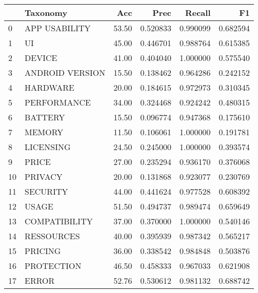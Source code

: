 \begin{tabular}{llrrrr}
\toprule
{} &         Taxonomy &    Acc &      Prec &    Recall &        F1 \\
\midrule
0  &    APP USABILITY &  53.50 &  0.520833 &  0.990099 &  0.682594 \\
1  &               UI &  45.00 &  0.446701 &  0.988764 &  0.615385 \\
2  &           DEVICE &  41.00 &  0.404040 &  1.000000 &  0.575540 \\
3  &  ANDROID VERSION &  15.50 &  0.138462 &  0.964286 &  0.242152 \\
4  &         HARDWARE &  20.00 &  0.184615 &  0.972973 &  0.310345 \\
5  &      PERFORMANCE &  34.00 &  0.324468 &  0.924242 &  0.480315 \\
6  &          BATTERY &  15.50 &  0.096774 &  0.947368 &  0.175610 \\
7  &           MEMORY &  11.50 &  0.106061 &  1.000000 &  0.191781 \\
8  &        LICENSING &  24.50 &  0.245000 &  1.000000 &  0.393574 \\
9  &            PRICE &  27.00 &  0.235294 &  0.936170 &  0.376068 \\
10 &          PRIVACY &  20.00 &  0.131868 &  0.923077 &  0.230769 \\
11 &         SECURITY &  44.00 &  0.441624 &  0.977528 &  0.608392 \\
12 &            USAGE &  51.50 &  0.494737 &  0.989474 &  0.659649 \\
13 &    COMPATIBILITY &  37.00 &  0.370000 &  1.000000 &  0.540146 \\
14 &       RESSOURCES &  40.00 &  0.395939 &  0.987342 &  0.565217 \\
15 &          PRICING &  36.00 &  0.338542 &  0.984848 &  0.503876 \\
16 &       PROTECTION &  46.50 &  0.458333 &  0.967033 &  0.621908 \\
17 &            ERROR &  52.76 &  0.530612 &  0.981132 &  0.688742 \\
\bottomrule
\end{tabular}
